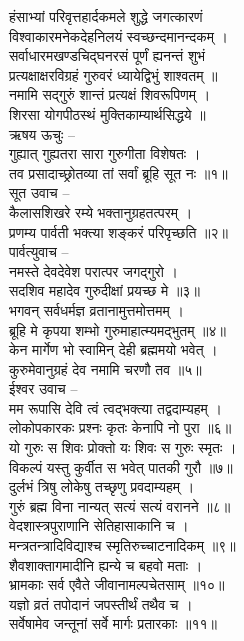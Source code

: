 हंसाभ्यां परिवृत्तहार्दकमले शुद्धे जगत्कारणं\\
विश्वाकारमनेकदेहनिलयं स्वच्छन्दमानन्दकम् ।\\
सर्वाधारमखण्डचिद्घनरसं पूर्णं ह्यनन्तं शुभं\\
प्रत्यक्षाक्षरविग्रहं गुरुवरं ध्यायेद्विभुं शाश्वतम् ॥\\
नमामि सद्गुरुं शान्तं प्रत्यक्षं शिवरूपिणम् ।\\
शिरसा योगपीठस्थं मुक्तिकाम्यार्थसिद्धये ॥\\
ऋषय ऊचुः –\\
गुह्यात् गुह्यतरा सारा गुरुगीता विशेषतः ।\\
तव प्रसादाच्छ्रोतव्या तां सर्वां ब्रूहि सूत नः ॥१॥\\
सूत उवाच –\\
कैलासशिखरे रम्ये भक्तानुग्रहतत्परम् ।\\
प्रणम्य पार्वती भक्त्या शङ्करं परिपृच्छति ॥२॥\\
पार्वत्युवाच –\\
नमस्ते देवदेवेश परात्पर जगद्गुरो ।\\
सदशिव महादेव गुरुदीक्षां प्रयच्छ मे ॥३॥\\
भगवन् सर्वधर्मज्ञ व्रतानामुत्तमोत्तमम् ।\\
ब्रूहि मे कृपया शम्भो गुरुमाहात्म्यमद्भुतम् ॥४॥\\
केन मार्गेण भो स्वामिन् देही ब्रह्ममयो भवेत् ।\\
कुरुमेवानुग्रहं देव नमामि चरणौ तव ॥५॥\\
ईश्वर उवाच – \\
मम रूपासि देवि त्वं त्वद्भक्त्या तद्वदाम्यहम् ।\\
लोकोपकारकः प्रश्नः कृतः केनापि नो पुरा ॥६॥\\
यो गुरुः स शिवः प्रोक्तो यः शिवः स गुरुः स्मृतः ।\\
विकल्पं यस्तु कुर्वीत स भवेत् पातकी गुरौ ॥७॥\\
दुर्लभं त्रिषु लोकेषु तच्छृणु प्रवदाम्यहम् ।\\
गुरुं ब्रह्म विना नान्यत् सत्यं सत्यं वरानने ॥८॥\\
वेदशास्त्रपुराणानि सेतिहासाकानि च ।\\
मन्त्रतन्त्रादिविद्याश्च स्मृतिरुच्चाटनादिकम् ॥९॥\\
शैवशाक्तागमादीनि ह्यन्ये च बहवो मताः ।\\
भ्रामकाः सर्व एवैते जीवानामल्पचेतसाम् ॥१०॥\\
यज्ञो व्रतं तपोदानं जपस्तीर्थं तथैव च ।\\
सर्वेषामेव जन्तूनां सर्वे मार्गः प्रतारकाः ॥११॥\\
